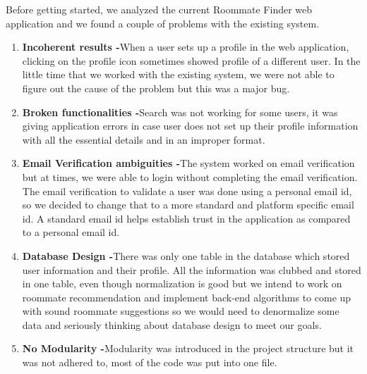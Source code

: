 \documentclass{sig-alternate-05-2015}
\begin{document}
Before getting started, we analyzed the current Roommate Finder web application and we found a couple of problems with the existing system. 
\begin{enumerate}
\item \textbf{Incoherent results -}When a user sets up a profile in the web application, clicking on the profile icon sometimes showed profile of a different user. In the little time that we worked with the existing system, we were not able to figure out the cause of the problem but this was a major bug.
\item \textbf{Broken functionalities -}Search was not working for some users, it was giving application errors in case user does not set up their profile information with all the essential details and in an improper format.
\item \textbf{Email Verification ambiguities -}The system worked on email verification but at times, we were able to login without completing the email verification. The email verification to validate a user was done using a personal email id, so we decided to change that to a more standard and platform specific email id. A standard email id helps establish trust in the application as compared to a personal email id.
\item \textbf{Database Design -}There was only one table in the database which stored user information and their profile. All the information was clubbed and stored in one table, even though normalization is good but we intend to work on roommate recommendation and implement back-end algorithms to come up with sound roommate suggestions so we would need to denormalize some data and seriously thinking about database design to meet our goals.
\item \textbf{No Modularity -}Modularity was introduced in the project structure but it was not adhered to, most of the code was put into one file.
\end{enumerate}
\end{document}
